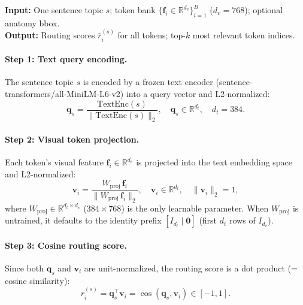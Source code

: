 \documentclass[11pt,a4paper]{article}
\newcommand{\RR}{\mathbb{R}}
\begin{document}
\begin{iobox}
\textcolor{inputcolor}{\textbf{Input:}} One sentence topic $s$; token bank $\{\mathbf{f}_i \in \RR^{d_v}\}_{i=1}^B$ ($d_v{=}768$); optional anatomy bbox.\\
\textcolor{outputcolor}{\textbf{Output:}} Routing scores $\hat{r}_i^{(s)}$ for all tokens; top-$k$ most relevant token indices.
\end{iobox}

\paragraph{Step 1: Text query encoding.}
The sentence topic $s$ is encoded by a frozen text encoder (sentence-transformers/all-MiniLM-L6-v2) into a query vector and L2-normalized:
\begin{equation}
\mathbf{q}_s = \frac{\mathrm{TextEnc}(s)}{\lVert \mathrm{TextEnc}(s) \rVert_2}, \quad \mathbf{q}_s \in \RR^{d_t}, \quad d_t = 384.
\label{eq:query}
\end{equation}

\paragraph{Step 2: Visual token projection.}
Each token's visual feature $\mathbf{f}_i \in \RR^{d_v}$ is projected into the text embedding space and L2-normalized:
\begin{equation}
\mathbf{v}_i = \frac{W_{\mathrm{proj}} \, \mathbf{f}_i}{\lVert W_{\mathrm{proj}} \, \mathbf{f}_i\rVert_2}, \quad \mathbf{v}_i \in \RR^{d_t}, \quad \lVert \mathbf{v}_i \rVert_2 = 1,
\label{eq:projection}
\end{equation}
where $W_{\mathrm{proj}} \in \RR^{d_t \times d_v}$ ($384 \times 768$) is the only learnable parameter. When $W_{\mathrm{proj}}$ is untrained, it defaults to the identity prefix $[I_{d_t} \mid \mathbf{0}]$ (first $d_t$ rows of $I_{d_v}$).

\paragraph{Step 3: Cosine routing score.}
Since both $\mathbf{q}_s$ and $\mathbf{v}_i$ are unit-normalized, the routing score is a dot product (= cosine similarity):
\begin{equation}
r_i^{(s)} = \mathbf{q}_s^\top \mathbf{v}_i = \cos(\mathbf{q}_s, \mathbf{v}_i) \in [-1, 1].
\label{eq:routing_score}
\end{equation}
\end{document}
